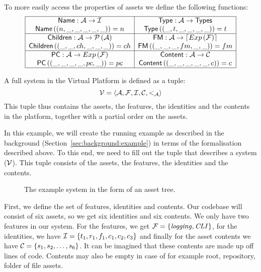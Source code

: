 To more easily access the properties of assets we define the following
functions:
\[
  \begin{array}{|c|c|}
    \hline
    {\sf Name} : \mathcal{A} \rightarrow \mathcal{I} & {\sf Type} : \mathcal{A} \rightarrow {\sf Types} \\
    {\sf Name} \left( \left( n, \_, \_, \_, \_, \_ \right) \right) = n & {\sf Type} \left( \left( \_, t, \_, \_, \_, \_ \right) \right) = t \\
    \hline 
    {\sf Children} : \mathcal{A} \rightarrow \mathcal{P} \left(\mathcal{A}\right) & {\sf FM} : \mathcal{A} \rightarrow \lceil Exp \left( \mathcal{F} \right) \rceil \\
    {\sf Children} \left( \left( \_, \_, ch, \_, \_, \_ \right) \right) = ch & {\sf FM} \left( \left( \_, \_, \_, fm, \_, \_ \right) \right) = fm \\
    \hline
    {\sf PC} : \mathcal{A} \rightarrow Exp \left( \mathcal{F} \right) & {\sf Content} : \mathcal{A} \rightarrow \mathcal{C} \\
    {\sf PC} \left( \left( \_, \_, \_, \_, pc, \_ \right) \right) = pc & {\sf Content} \left( \left( \_, \_, \_, \_, \_, c \right) \right) = c \\
    \hline
  \end{array}
\]

A full system in the Virtual Platform is defined as a tuple:
\[
  \mathcal{V} = \left< \mathcal{A} , \mathcal{F} , \mathcal{I} , \mathcal{C}, <_{\mathcal{A}} \right>
\]
This tuple thus contains the assets, the features, the identities and the
contents in the platform, together with a partial order on the assets.

\begin{example}\label{example:basicsystem}
In this example, we will create the running example as described in the background
(Section~\ref{sec:background:example}) in terms of the formalisation described above.
To this end, we need to fill out the tuple that describes a system (\( \mathcal{V} \)).
This tuple consists of the assets, the features, the identities and the contents.
\end{example}
\begin{figure}
  \centering
  \caption{The example system in the form of an asset tree.}
  \label{fig:example:basicsystem}
\end{figure}
First, we define the set of features, identities and contents. Our codebase
will consist of six assets, so we get six identities and six contents. We only
have two features in our system. For the features, we get \( \mathcal{F} = \left\{ \mathit{logging}, \mathit{CLI} \right\} \),
for the identities, we have \( \mathcal{I} = \left\{ t_1, r_1, f_1, c_1, c_2, c_3 \right\} \)
and finally for the asset contents we have \( \mathcal{C} = \left\{ s_1, s_2, \dots, s_6 \right\} \).
It can be imagined that these contents are made up off lines of code. Contents
may also be empty in case of for example root, repository, folder of file assets.

